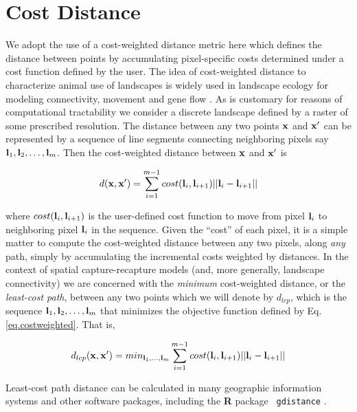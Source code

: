 \documentclass[12pt]{article}
\begin{document}
\section{Cost Distance}

We adopt the use of a cost-weighted distance metric here which
defines the
distance between points by accumulating pixel-specific costs determined under
a cost function defined by the user.
The idea of cost-weighted distance to characterize animal use of
landscapes  is widely used in
landscape ecology for modeling connectivity, movement and gene flow
\citep{beier_etal:2008}. As is customary for reasons of
computational tractability we consider a discrete landscape defined by a
raster of some prescribed resolution. The distance between any two points
${\bf x}$ and ${\bf x}'$ can be represented by a sequence of line segments
connecting neighboring  pixels say
${\bf l}_{1},{\bf l}_{2},\ldots,{\bf l}_{m}$. Then the cost-weighted distance
between ${\bf x}$ and ${\bf x}'$ is

\begin{equation}
 d({\bf x},{\bf x}')
  =  \sum_{i=1}^{m-1} cost({\bf l}_{i},{\bf l}_{i+1})||{\bf l}_{i} - {\bf l}_{i+1}||
\label{eq.costweighted}
\end{equation}

{\flushleft
where } $cost({\bf l}_{i},{\bf l}_{i+1})$ is the user-defined cost function
to move
from pixel ${\bf l}_{i}$ to neighboring pixel ${\bf l}_{i}$ in the sequence.
Given the ``cost'' of each pixel, it is a simple matter to compute the
cost-weighted distance between any two pixels, along {\it any} path,
simply by accumulating the incremental  costs weighted by
distances.
In the context of
spatial capture-recapture models (and, more generally, landscape
connectivity) we are concerned with the {\it minimum} cost-weighted
distance, or the {\it least-cost path}, between any two points which
we will denote by $d_{lcp}$, which is
the
sequence ${\bf l}_{1},{\bf l}_{2},\ldots,{\bf l}_{m}$ that minimizes
the objective function defined by Eq. \ref{eq.costweighted}. That is,

\begin{equation}
 d_{lcp}({\bf x},{\bf x}')
  =  min_{{\bf l}_{1},\ldots,{\bf l}_{m}}  \sum_{i=1}^{m-1} cost({\bf l}_{i},{\bf l}_{i+1})||{\bf l}_{i} - {\bf l}_{i+1}||
\label{eq.lcp}
\end{equation}

{\flushleft
 Least-cost} path distance can be calculated in
 many geographic information systems and other software packages,
including the {\bf R} package \mbox{\tt
  gdistance} \citep{vanetten:2011}.
\end{document}
